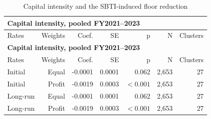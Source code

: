 {\small\setlength{\LTpre}{4pt}\setlength{\LTpost}{4pt}
\begin{longtable}{@{}lrrrrrr@{}}
\caption{Capital intensity and the SBTI-induced floor reduction}\label{tab:tab_v2_app_table3_h5_regression} \\
\multicolumn{7}{l}{\textbf{Capital intensity, pooled FY2021–2023}} \\
\toprule
Rates & Weights & Coef. & SE & p & N & Clusters \\
\midrule
\endfirsthead
\multicolumn{7}{l}{\textbf{Capital intensity, pooled FY2021–2023}} \\
\toprule
Rates & Weights & Coef. & SE & p & N & Clusters \\
\midrule
\endhead
\midrule
\endfoot
\bottomrule
\endlastfoot
Initial & Equal & -0.0001 & 0.0001 & 0.062 & 2,653 & 27 \\
Initial & Profit & -0.0019 & 0.0003 & $<0.001$ & 2,653 & 27 \\
Long-run & Equal & -0.0001 & 0.0001 & 0.062 & 2,653 & 27 \\
Long-run & Profit & -0.0019 & 0.0003 & $<0.001$ & 2,653 & 27 \\
\end{longtable}
\par{}\par
}
